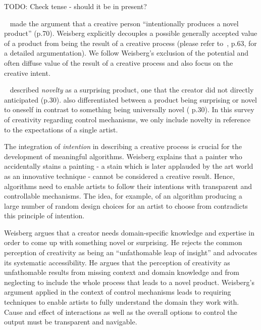 TODO: Check tense - should it be in present?

\citeauthor*{weisberg_2006_cui}~\cite{weisberg_2006_cui} made the argument that a creative person ``intentionally produces a novel product'' (p.70). Weisberg explicitly decouples a possible generally accepted value of a product from being the result of a creative process (please refer to~\cite{weisberg_2006_cui}, p.63, for a detailed argumentation). We follow Weisberg's exclusion of the potential and often diffuse value of the result of a creative process and also focus on the creative intent. 

\citeauthor*{boden_2010_cat}~\cite{boden_2010_cat} described \textit{novelty} as a surprising product, one that the creator did not directly anticipated (p.30). \citeauthor*{boden_2010_cat} also differentiated between a product being surprising or novel to oneself in contrast to something being universally novel (\cite{boden_2010_cat} p.30). In this survey of creativity regarding control mechanisms, we only include novelty in reference to the expectations of a single artist.

The integration of \textit{intention} in describing a creative process is crucial for the development of meaningful algorithms. Weisberg explains that a painter who accidentally stains a painting - a stain which is later applauded by the art world as an innovative technique - cannot be considered a creative result. Hence, algorithms need to enable artists to follow their intentions with transparent and controllable mechanisms. The idea, for example, of an algorithm producing a large number of random design choices for an artist to choose from contradicts this principle of intention.


Weisberg argues that a creator needs domain-specific knowledge and expertise in order to come up with something novel or surprising. 
He rejects the common perception of creativity as being an ``unfathomable leap of insight'' and advocates its systematic accessibility. He argues that the perception of creativity as unfathomable results from missing context and domain knowledge and from neglecting to include the whole process that leads to a novel product. Weisberg's argument applied in the context of control mechanisms leads to requiring techniques to enable artists to fully understand the domain they work with. Cause and effect of interactions as well as the overall options to control the output must be transparent and navigable.

